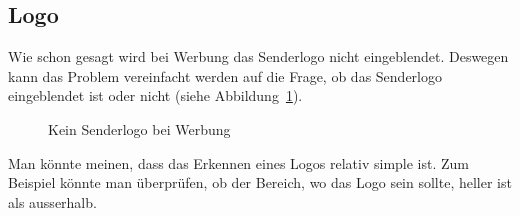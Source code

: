 \documentclass[12pt,a4paper]{report}
\begin{document}
\subsection{Logo}
Wie schon gesagt wird bei Werbung das Senderlogo nicht eingeblendet.
Deswegen kann das Problem vereinfacht werden auf die Frage,
ob das Senderlogo eingeblendet ist oder nicht (siehe Abbildung~\ref{fig:logo1}).
\begin{figure}[h]%
    \centering
    \qquad
    \caption{Kein Senderlogo bei Werbung}%
    \label{fig:logo1}%
\end{figure}
Man könnte meinen, dass das Erkennen eines Logos relativ simple ist.
Zum Beispiel könnte man überprüfen, ob der Bereich, wo das Logo sein sollte, heller ist als ausserhalb.
\end{document}
